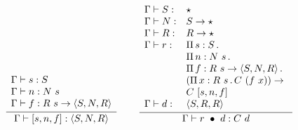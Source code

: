 \documentclass{article}
\begin{document}
\begin{figure}
\[\begin{array}{lllll}
          \\ \\ 
\infer{\Gamma \vdash \ctor{s}{n}{f} : \w{S}{N}{R}}
      {\begin{array}{l}\Gamma \vdash s : S \\ \Gamma \vdash n : N\ s \\ \Gamma \vdash f : R\ s \to \w{S}{N}{R}\end{array}}
      &\ &
\infer{\Gamma \vdash \wrec{r}{d} : C\ d}
      {
        \begin{array}{lll}
\Gamma \vdash S : & \star \\
\Gamma \vdash N : & S \to \star \\
\Gamma \vdash R : & R \to \star \\          
\Gamma \vdash r : & \Pia{s}{S}{\ }  \\
\ &  \Pia{n}{N\ s}{\ }  \\
\ &  \Pia{f}{R\ s \to \w{S}{N}{R}}{\ }  \\
\ &  (\Pia{x}{R\ s}{C\ (f\ x)}) \to  \\
\ &  C\ \ctor{s}{n}{f} \\
\Gamma\vdash d : & \w{S}{R}{R}
        \end{array} }
  \end{array}
  \]
  \label{Typing rules of Q}
  \label{fig:tp}
\end{figure}




\end{document}
